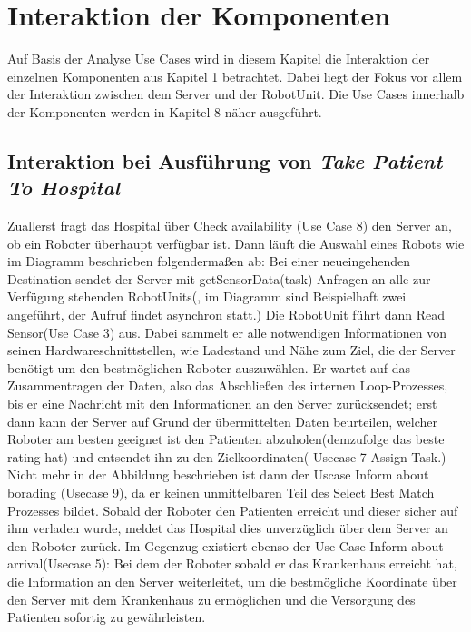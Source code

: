 \section{Interaktion der Komponenten}
Auf Basis der Analyse Use Cases wird in diesem Kapitel die Interaktion der einzelnen Komponenten aus Kapitel 1 betrachtet. Dabei liegt der Fokus vor allem der Interaktion zwischen dem Server und der RobotUnit. Die Use Cases innerhalb der Komponenten werden in Kapitel 8 näher ausgeführt. \\


\subsection*{Interaktion bei Ausführung von \emph{Take Patient To Hospital}}

Zuallerst fragt das Hospital über Check availability (Use Case 8) den Server an, ob ein Roboter überhaupt verfügbar ist. Dann läuft die Auswahl eines Robots wie im Diagramm beschrieben folgendermaßen ab: Bei einer neueingehenden Destination sendet der Server mit getSensorData(task) Anfragen an alle zur Verfügung stehenden RobotUnits(, im Diagramm sind Beispielhaft zwei angeführt, der Aufruf findet asynchron statt.) Die RobotUnit führt dann Read Sensor(Use Case 3) aus. Dabei sammelt er alle notwendigen Informationen von seinen Hardwareschnittstellen, wie Ladestand und Nähe zum Ziel, die der Server benötigt um den bestmöglichen Roboter auszuwählen. Er wartet auf das Zusammentragen der Daten, also das Abschließen des internen Loop-Prozesses, bis er eine Nachricht mit den Informationen an den Server zurücksendet; erst dann kann der Server auf Grund der übermittelten Daten beurteilen, welcher Roboter am besten geeignet ist den Patienten abzuholen(demzufolge das beste rating hat) und entsendet ihn zu den Zielkoordinaten( Usecase 7 Assign Task.) Nicht mehr in der Abbildung beschrieben ist dann der Uscase Inform about borading (Usecase 9), da er keinen unmittelbaren Teil des Select Best Match Prozesses bildet. Sobald der Roboter den Patienten erreicht und dieser sicher auf ihm verladen wurde, meldet das Hospital dies unverzüglich über dem Server an den Roboter zurück. Im Gegenzug existiert ebenso der Use Case Inform about arrival(Usecase 5): Bei dem der Roboter sobald er das Krankenhaus erreicht hat, die Information an den Server weiterleitet, um die bestmögliche Koordinate über den Server mit dem Krankenhaus zu ermöglichen und die Versorgung des Patienten sofortig zu gewährleisten.

